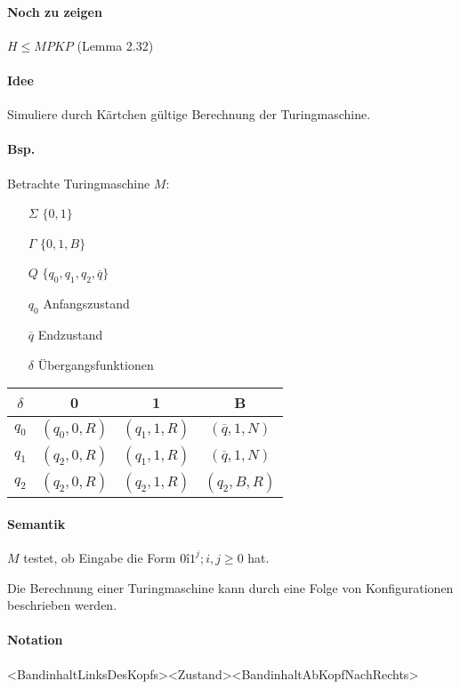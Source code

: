 \paragraph*{Noch zu zeigen} $H \leq MPKP$ (Lemma 2.32)

\paragraph*{Idee} Simuliere durch Kärtchen gültige Berechnung der Turingmaschine.

\paragraph*{Bsp.} Betrachte Turingmaschine $M$:
\begin{itemize}
	\item[$\Sigma$] $\{ 0,1 \}$
	\item[$\Gamma$] $\{ 0,1,B \}$
	\item[$Q$] $\{ q_0,q_1,q_2,\overline{q} \}$
	\item[$q_0$] Anfangszustand
	\item[$\overline{q}$] Endzustand
	\item[$\delta$] Übergangsfunktionen
\end{itemize}

\begin{table}[htb!] %
\centering
\begin{tabular}{c|c c c}
$\delta$ & 0 & 1 & B \\
\hline
$q_0$ & $(q_0,0,R)$ & $(q_1,1,R)$ & $(\overline{q},1,N)$ \\
$q_1$ & $(q_2,0,R)$ & $(q_1,1,R)$ & $(\overline{q},1,N)$ \\
$q_2$ & $(q_2,0,R)$ & $(q_2,1,R)$ & $(q_2,B,R)$ \\
\end{tabular}
\end{table}

\paragraph*{Semantik} $M$ testet, ob Eingabe die Form $0î1^j;i,j \geq 0$ hat.

\para{} Die Berechnung einer Turingmaschine kann durch eine Folge von Konfigurationen beschrieben werden.

\paragraph*{Notation} <BandinhaltLinksDesKopfs><Zustand><BandinhaltAbKopfNachRechts>

